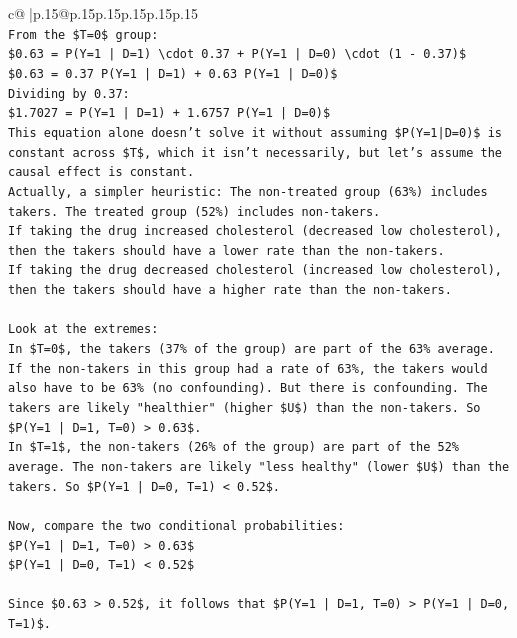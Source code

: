\documentclass{article}
\begin{document}
{\begin{supertabular}{c@{$\;$}|p{.15\linewidth}@{}p{.15\linewidth}p{.15\linewidth}p{.15\linewidth}p{.15\linewidth}p{.15\linewidth}}
{{{\\ 
\texttt{From the \$T=0\$ group:} \\
\texttt{\$0.63 = P(Y=1 | D=1) \textbackslash{}cdot 0.37 + P(Y=1 | D=0) \textbackslash{}cdot (1 {-} 0.37)\$} \\
\texttt{\$0.63 = 0.37 P(Y=1 | D=1) + 0.63 P(Y=1 | D=0)\$} \\
\texttt{Dividing by 0.37:} \\
\texttt{\$1.7027 = P(Y=1 | D=1) + 1.6757 P(Y=1 | D=0)\$} \\
\texttt{This equation alone doesn't solve it without assuming \$P(Y=1|D=0)\$ is constant across \$T\$, which it isn't necessarily, but let's assume the causal effect is constant.} \\
\texttt{Actually, a simpler heuristic: The non{-}treated group (63\%) includes takers. The treated group (52\%) includes non{-}takers.} \\
\texttt{If taking the drug increased cholesterol (decreased low cholesterol), then the takers should have a lower rate than the non{-}takers.} \\
\texttt{If taking the drug decreased cholesterol (increased low cholesterol), then the takers should have a higher rate than the non{-}takers.} \\
\\ 
\texttt{Look at the extremes:} \\
\texttt{In \$T=0\$, the takers (37\% of the group) are part of the 63\% average. If the non{-}takers in this group had a rate of 63\%, the takers would also have to be 63\% (no confounding). But there is confounding. The takers are likely "healthier" (higher \$U\$) than the non{-}takers. So \$P(Y=1 | D=1, T=0) > 0.63\$.} \\
\texttt{In \$T=1\$, the non{-}takers (26\% of the group) are part of the 52\% average. The non{-}takers are likely "less healthy" (lower \$U\$) than the takers. So \$P(Y=1 | D=0, T=1) < 0.52\$.} \\
\\ 
\texttt{Now, compare the two conditional probabilities:} \\
\texttt{\$P(Y=1 | D=1, T=0) > 0.63\$} \\
\texttt{\$P(Y=1 | D=0, T=1) < 0.52\$} \\
\\ 
\texttt{Since \$0.63 > 0.52\$, it follows that \$P(Y=1 | D=1, T=0) > P(Y=1 | D=0, T=1)\$.} \\
}}}
\end{supertabular}}
\end{document}
